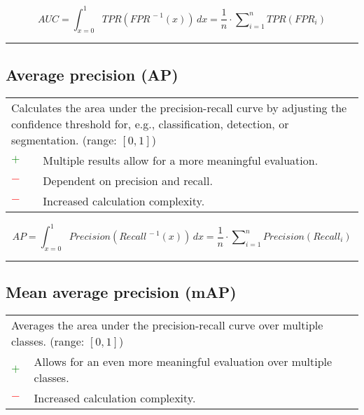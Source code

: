 \documentclass{article}
\begin{document}
\begin{equation}
	\textit{AUC} = \int_{x = 0}^1 \textit{TPR}(\textit{FPR}^{\,-1}(x)) \,dx = \dfrac{1}{n} \cdot \sum\nolimits_{i = 1}^n \textit{TPR}(\textit{FPR}_i)
%
	\label{equation:AUC}
\end{equation}

\hrule


\subsection[Average precision (AP)]{Average precision (AP) \cite{manning2009introduction, everingham2010pascal}}

\begin{table}[H]\centering
	\begin{tabular}{m{}m{}}
		\multicolumn{2}{m{0.95\textwidth}}{Calculates the area under the precision-recall curve by adjusting the confidence threshold for, e.g., classification, detection, or segmentation. (range: $[0, 1]$)} \\
		\textcolor{Green}{$+$} & Multiple results allow for a more meaningful evaluation. \\
		\textcolor{Red}{$-$}   & Dependent on precision and recall. \\
		\textcolor{Red}{$-$}   & Increased calculation complexity.
	\end{tabular}
\end{table}

\begin{equation}
	\textit{AP} = \int_{x = 0}^1 \textit{Precision}(\textit{Recall}^{\,-1}(x)) \,dx = \dfrac{1}{n} \cdot \sum\nolimits_{i = 1}^n \textit{Precision}(\textit{Recall}_i)
%
	\label{equation:AP}
\end{equation}

\hrule


\subsection[Mean average precision (mAP)]{Mean average precision (mAP) \cite{manning2009introduction, everingham2010pascal}}

\begin{table}[H]\centering
	\begin{tabular}{m{}m{}}
		\multicolumn{2}{m{0.95\textwidth}}{Averages the area under the precision-recall curve over multiple classes. (range: $[0, 1]$)} \\
		\textcolor{Green}{$+$} & Allows for an even more meaningful evaluation over multiple classes. \\
		\textcolor{Red}{$-$}   & Increased calculation complexity.
	\end{tabular}
\end{table}
\end{document}
